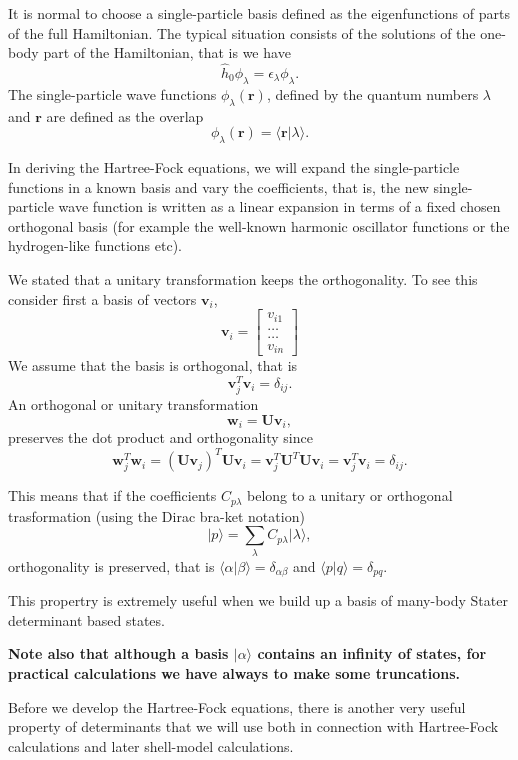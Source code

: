 \documentclass[%
oneside,                 %
final,                   %
10pt]{article}
\begin{document}
It is normal to choose a single-particle basis defined as the eigenfunctions
of parts of the full Hamiltonian. The typical situation consists of the solutions of the one-body part of the Hamiltonian, that is we have
\[
\hat{h}_0\phi_{\lambda}=\epsilon_{\lambda}\phi_{\lambda}.
\]
The single-particle wave functions $\phi_{\lambda}(\mathbf{r})$, defined by the quantum numbers $\lambda$ and $\mathbf{r}$
are defined as the overlap 
\[
   \phi_{\lambda}(\mathbf{r})  = \langle \mathbf{r} | \lambda \rangle .
\]

In deriving the Hartree-Fock equations, we  will expand the single-particle functions in a known basis  and vary the coefficients, 
that is, the new single-particle wave function is written as a linear expansion
in terms of a fixed chosen orthogonal basis (for example the well-known harmonic oscillator functions or the hydrogen-like functions etc).

We stated that a unitary transformation keeps the orthogonality. To see this consider first a basis of vectors $\mathbf{v}_i$,
\[
\mathbf{v}_i = \begin{bmatrix} v_{i1} \\ \dots \\ \dots \\v_{in} \end{bmatrix}
\]
We assume that the basis is orthogonal, that is 
\[
\mathbf{v}_j^T\mathbf{v}_i = \delta_{ij}.
\]
An orthogonal or unitary transformation
\[
\mathbf{w}_i=\mathbf{U}\mathbf{v}_i,
\]
preserves the dot product and orthogonality since
\[
\mathbf{w}_j^T\mathbf{w}_i=(\mathbf{U}\mathbf{v}_j)^T\mathbf{U}\mathbf{v}_i=\mathbf{v}_j^T\mathbf{U}^T\mathbf{U}\mathbf{v}_i= \mathbf{v}_j^T\mathbf{v}_i = \delta_{ij}.
\]

This means that if the coefficients $C_{p\lambda}$ belong to a unitary or orthogonal trasformation (using the Dirac bra-ket notation)
\[
\vert p\rangle  = \sum_{\lambda} C_{p\lambda}\vert\lambda\rangle,
\]
orthogonality is preserved, that is $\langle \alpha \vert \beta\rangle = \delta_{\alpha\beta}$
and $\langle p \vert q\rangle = \delta_{pq}$. 

This propertry is extremely useful when we build up a basis of many-body Stater determinant based states. 

\textbf{Note also that although a basis $\vert \alpha\rangle$ contains an infinity of states, for practical calculations we have always to make some truncations.} 

Before we develop the Hartree-Fock equations, there is another very useful property of determinants that we will use both in connection with Hartree-Fock calculations and later shell-model calculations.  
\end{document}
